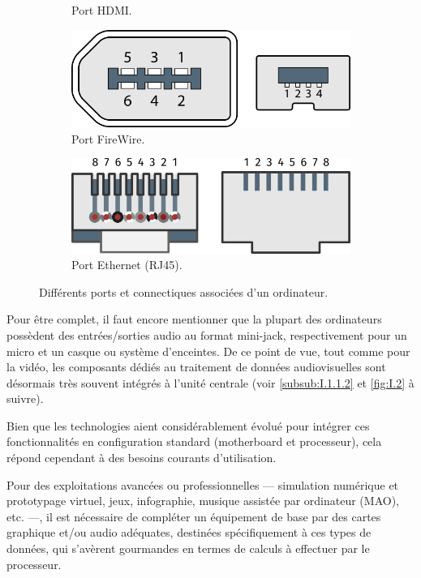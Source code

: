 \begin{figure}[!hb]
\begin{subfigure}[b]{0.35\linewidth}
		\caption{\label{fig:I.1d}Port HDMI.}
	\end{subfigure}\hfill
	\begin{subfigure}[b]{0.3\linewidth}\Centering
		\includegraphics[width=0.75\linewidth]{./Images/Chapter01/figI-01e-firewire.png}
		\caption{\label{fig:I.1e}Port FireWire.}
	\end{subfigure}\hfill
	\begin{subfigure}[b]{0.3\linewidth}\Centering
		\includegraphics[width=0.8\linewidth]{./Images/Chapter01/figI-01f-rj45-ethernet.png}
		\caption{\label{fig:I.1f}Port Ethernet (RJ45).}
	\end{subfigure}
	\caption{\label{fig:I.1}Différents ports et connectiques associées d'un ordinateur.}
\end{figure}

Pour être complet, il faut encore mentionner que la plupart des ordinateurs possèdent des entrées/sorties audio au format mini-jack, respectivement pour un micro et un casque ou système d'enceintes.
De ce point de vue, tout comme pour la vidéo, les composants dédiés au traitement de données audiovisuelles sont désormais très souvent intégrés à l'unité centrale (voir \cref{subsub:I.1.1.2} et \cref{fig:I.2} à suivre).

Bien que les technologies aient considérablement évolué pour intégrer ces fonctionnalités en configuration standard (\gls{motherboard} et processeur), cela répond cependant à des besoins courants d'utilisation. 

Pour des exploitations avancées ou professionnelles --- simulation numérique et prototypage virtuel, jeux, infographie, musique assistée par ordinateur (MAO), etc. ---, il est nécessaire de compléter un équipement de base par des cartes graphique et/ou audio adéquates, destinées spécifiquement à ces types de données, qui s'avèrent gourmandes en termes de calculs à effectuer par le processeur.


